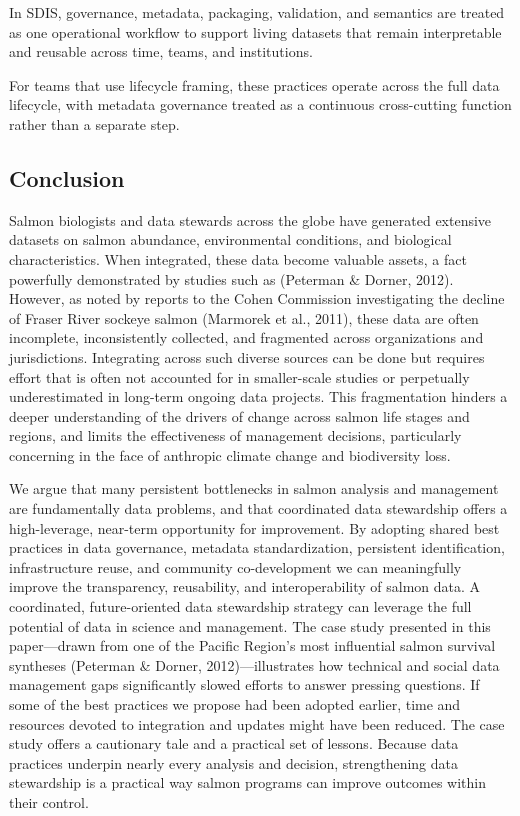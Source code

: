 \documentclass[
  letterpaper,
  DIV=11,
  numbers=noendperiod]{scrartcl}
\begin{document}
In SDIS, governance, metadata, packaging, validation, and semantics are
treated as one operational workflow to support living datasets that
remain interpretable and reusable across time, teams, and institutions.

For teams that use lifecycle framing, these practices operate across the
full data lifecycle, with metadata governance treated as a continuous
cross-cutting function rather than a separate step.

\subsection{Conclusion}\label{conclusion}

Salmon biologists and data stewards across the globe have generated
extensive datasets on salmon abundance, environmental conditions, and
biological characteristics. When integrated, these data become valuable
assets, a fact powerfully demonstrated by studies such as (Peterman \&
Dorner, 2012). However, as noted by reports to the Cohen Commission
investigating the decline of Fraser River sockeye salmon (Marmorek et
al., 2011), these data are often incomplete, inconsistently collected,
and fragmented across organizations and jurisdictions. Integrating
across such diverse sources can be done but requires effort that is
often not accounted for in smaller-scale studies or perpetually
underestimated in long-term ongoing data projects. This fragmentation
hinders a deeper understanding of the drivers of change across salmon
life stages and regions, and limits the effectiveness of management
decisions, particularly concerning in the face of anthropic climate
change and biodiversity loss.

We argue that many persistent bottlenecks in salmon analysis and
management are fundamentally data problems, and that coordinated data
stewardship offers a high-leverage, near-term opportunity for
improvement. By adopting shared best practices in data governance,
metadata standardization, persistent identification, infrastructure
reuse, and community co-development we can meaningfully improve the
transparency, reusability, and interoperability of salmon data. A
coordinated, future-oriented data stewardship strategy can leverage the
full potential of data in science and management. The case study
presented in this paper---drawn from one of the Pacific Region's most
influential salmon survival syntheses (Peterman \& Dorner,
2012)---illustrates how technical and social data management gaps
significantly slowed efforts to answer pressing questions. If some of
the best practices we propose had been adopted earlier, time and
resources devoted to integration and updates might have been reduced.
The case study offers a cautionary tale and a practical set of lessons.
Because data practices underpin nearly every analysis and decision,
strengthening data stewardship is a practical way salmon programs can
improve outcomes within their control.
\end{document}
